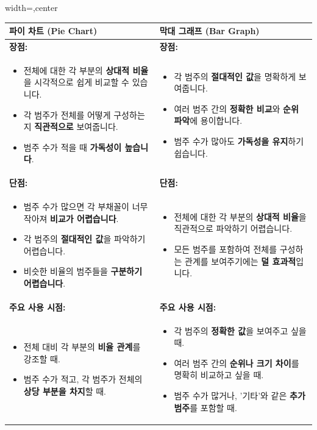\documentclass[11pt,a4paper]{article}
\begin{document}
\begin{adjustbox}{width=\textwidth,center}
\begin{tabular}{p{}p{}}
\toprule
\textbf{파이 차트 (Pie Chart)} & \textbf{막대 그래프 (Bar Graph)} \\
\midrule
\textbf{장점:} & \textbf{장점:} \\
\begin{itemize}
    \item 전체에 대한 각 부분의 \textbf{상대적 비율}을 시각적으로 쉽게 비교할 수 있습니다.
    \item 각 범주가 전체를 어떻게 구성하는지 \textbf{직관적으로} 보여줍니다.
    \item 범주 수가 적을 때 \textbf{가독성이 높습니다}.
\end{itemize}
&
\begin{itemize}
    \item 각 범주의 \textbf{절대적인 값}을 명확하게 보여줍니다.
    \item 여러 범주 간의 \textbf{정확한 비교}와 \textbf{순위 파악}에 용이합니다.
    \item 범주 수가 많아도 \textbf{가독성을 유지}하기 쉽습니다.
\end{itemize}
\\
\textbf{단점:} & \textbf{단점:} \\
\begin{itemize}
    \item 범주 수가 많으면 각 부채꼴이 너무 작아져 \textbf{비교가 어렵습니다}.
    \item 각 범주의 \textbf{절대적인 값}을 파악하기 어렵습니다.
    \item 비슷한 비율의 범주들을 \textbf{구분하기 어렵습니다}.
\end{itemize}
&
\begin{itemize}
    \item 전체에 대한 각 부분의 \textbf{상대적 비율}을 직관적으로 파악하기 어렵습니다.
    \item 모든 범주를 포함하여 전체를 구성하는 관계를 보여주기에는 \textbf{덜 효과적}입니다.
\end{itemize}
\\
\textbf{주요 사용 시점:} & \textbf{주요 사용 시점:} \\
\begin{itemize}
    \item 전체 대비 각 부분의 \textbf{비율 관계}를 강조할 때.
    \item 범주 수가 적고, 각 범주가 전체의 \textbf{상당 부분을 차지}할 때.
\end{itemize}
&
\begin{itemize}
    \item 각 범주의 \textbf{정확한 값}을 보여주고 싶을 때.
    \item 여러 범주 간의 \textbf{순위나 크기 차이}를 명확히 비교하고 싶을 때.
    \item 범주 수가 많거나, '기타'와 같은 \textbf{추가 범주}를 포함할 때.
\end{itemize}
\\
\bottomrule
\end{tabular}
\end{adjustbox}
\end{document}
